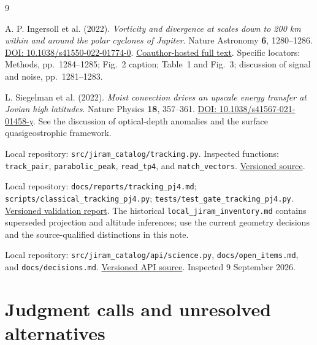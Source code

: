 \documentclass[11pt]{article}
\begin{document}
\begin{thebibliography}{9}
\raggedright
{}
A. P. Ingersoll et al. (2022).
\emph{Vorticity and divergence at scales down to 200 km within and around
the polar cyclones of Jupiter}. Nature Astronomy \textbf{6}, 1280--1286.
\href{https://doi.org/10.1038/s41550-022-01774-0}{DOI: 10.1038/s41550-022-01774-0}.
\href{https://pordlabs.ucsd.edu/wryoung/reprintPDFs/VortDiv.pdf}{Coauthor-hosted full text}.
Specific locators: Methods, pp.~1284--1285; Fig.~2 caption; Table~1 and
Fig.~3; discussion of signal and noise, pp.~1281--1283.

L. Siegelman et al. (2022).
\emph{Moist convection drives an upscale energy transfer at Jovian high latitudes}.
Nature Physics \textbf{18}, 357--361.
\href{https://doi.org/10.1038/s41567-021-01458-y}{DOI: 10.1038/s41567-021-01458-y}.
See the discussion of optical-depth anomalies and the surface
quasigeostrophic framework.

Local repository: \texttt{src/jiram\_catalog/tracking.py}.
Inspected functions: \texttt{track\_pair}, \texttt{parabolic\_peak},
\texttt{read\_tp4}, and \texttt{match\_vectors}.
\href{https://github.com/ksr-ocean/jiram_catalog/blob/a6e3938e5c816583c49833791f7500e562acf155/src/jiram_catalog/tracking.py}{Versioned source}.

Local repository: \texttt{docs/reports/tracking\_pj4.md};
\texttt{scripts/classical\_tracking\_pj4.py};
\texttt{tests/test\_gate\_tracking\_pj4.py}.
\href{https://github.com/ksr-ocean/jiram_catalog/blob/a6e3938e5c816583c49833791f7500e562acf155/docs/reports/tracking_pj4.md}{Versioned validation report}.
The historical \texttt{local\_jiram\_inventory.md} contains superseded
projection and altitude inferences; use the current geometry decisions and
the source-qualified distinctions in this note.

Local repository: \texttt{src/jiram\_catalog/api/science.py},
\texttt{docs/open\_items.md}, and \texttt{docs/decisions.md}.
\href{https://github.com/ksr-ocean/jiram_catalog/blob/a6e3938e5c816583c49833791f7500e562acf155/src/jiram_catalog/api/science.py}{Versioned API source}.
Inspected 9 September 2026.
\end{thebibliography}

\section*{Judgment calls and unresolved alternatives}
\end{document}
